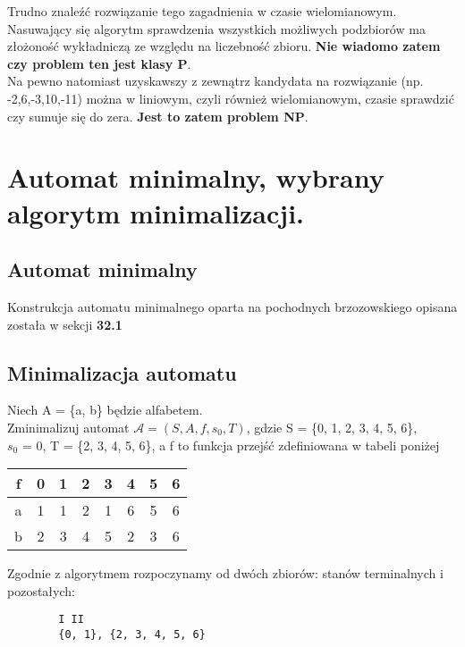 \documentclass[main.tex]{subfiles}
\begin{document}
    \noindent Trudno znaleźć rozwiązanie tego zagadnienia w czasie wielomianowym. Nasuwający się algorytm sprawdzenia wszystkich
    możliwych podzbiorów ma złożoność wykładniczą ze względu na liczebność zbioru. \textbf{Nie wiadomo zatem czy problem ten
    jest klasy P}.\\

    \noindent Na pewno natomiast uzyskawszy z zewnątrz kandydata na rozwiązanie (np. {-2,6,-3,10,-11}) można w
    liniowym, czyli również wielomianowym, czasie sprawdzić czy sumuje się do zera. \textbf{Jest to zatem problem NP}.


    \newpage

    \section{Automat minimalny, wybrany algorytm minimalizacji.}
    \subsection{Automat minimalny}
    Konstrukcja automatu minimalnego oparta na pochodnych brzozowskiego opisana została w sekcji \textbf{32.1}

    \subsection{Minimalizacja automatu}
    \begin{exercise}
        Niech A = \{a, b\} będzie alfabetem. \\
        Zminimalizuj automat $\mathcal{A} = (S, A, f, s_0, T)$, gdzie S = \{0, 1, 2, 3, 4, 5, 6\}, \\
        $s_0$ = 0, T = \{2, 3, 4, 5, 6\}, a f to funkcja przejść zdefiniowana w tabeli poniżej
    \end{exercise}

    \begin{table}[H]
        \centering
        \begin{tabular}{|c|c|c|c|c|c|c|c|}
            \hline
            f & 0 & 1 & 2 & 3 & 4 & 5 & 6 \\ \hline
            a & 1 & 1 & 2 & 1 & 6 & 5 & 6 \\ \hline
            b & 2 & 3 & 4 & 5 & 2 & 3 & 6 \\ \hline
        \end{tabular}
    \end{table}

    \noindent Zgodnie z algorytmem rozpoczynamy od dwóch zbiorów: stanów terminalnych i pozostałych:
    \begin{verbatim}
        I II
        {0, 1}, {2, 3, 4, 5, 6}
    \end{verbatim}
\end{document}
